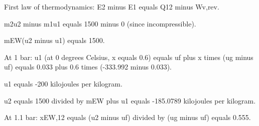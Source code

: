 First law of thermodynamics:  
E2 minus E1 equals Q12 minus Wv,rev.  

m2u2 minus m1u1 equals 1500 minus 0 (since incompressible).  

mEW(u2 minus u1) equals 1500.  

At 1 bar:  
u1 (at 0 degrees Celsius, x equals 0.6) equals uf plus x times (ug minus uf) equals 0.033 plus 0.6 times (-333.992 minus 0.033).  

u1 equals -200 kilojoules per kilogram.  

u2 equals 1500 divided by mEW plus u1 equals -185.0789 kilojoules per kilogram.  

At 1.1 bar:  
xEW,12 equals (u2 minus uf) divided by (ug minus uf) equals 0.555.